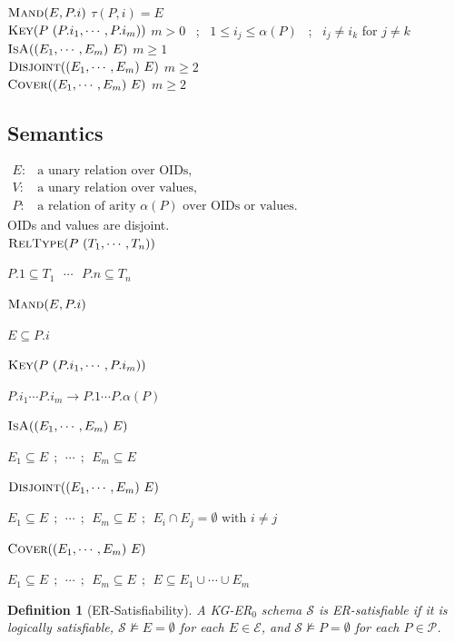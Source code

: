 \documentclass[10pt]{article}
\newtheorem*{definition}{Definition}
\begin{document}
$\textsc{Mand}(E, P.i)$
\hfill { $\tau(P,i)=E$}\\
%
$\textsc{Key}(P\ (P.i_1, \cdots , P.i_m))$ \hfill{ $m>0$ ~;~ \(1\leq i_j\leq\alpha(P)\) ~;~ \(i_j\neq i_k\) for $j\neq k$}\\
%
$\textsc{IsA}((E_1,\cdots,E_m)\ E)$ \hfill{ $m\geq 1$}\\
$\textsc{Disjoint}((E_1,\cdots,E_m)\ E)$ \hfill{ $m\geq 2$}\\
$\textsc{Cover}((E_1,\cdots,E_m)\ E)$ \hfill{ $m\geq 2$}


\subsection*{Semantics}

\noindent$
\begin{array}{ll}
E: & \text{a unary relation over OIDs,}\\
V: & \text{a unary relation over values,}\\
P: & \text{a relation of arity \(\alpha(P)\) over OIDs or values.}
\end{array}
$\\
OIDs and values are disjoint.
\\

\noindent
$\textsc{RelType}(P\ (T_1, \cdots , T_n))$

$P.1\subseteq T_1 ~~~\cdots~~~ P.n\subseteq T_n$

\noindent
$\textsc{Mand}(E, P.i)$

$E\subseteq P.i$

\noindent
$\textsc{Key}(P\ (P.i_1, \cdots , P.i_m))$

$P.i_1 \cdots P.i_m\rightarrow P.1\cdots P.{\alpha(P)}$

\noindent
$\textsc{IsA}((E_1,\cdots,E_m)\ E)$

$E_1\subseteq E ~~;~~\cdots ~~;~~E_m\subseteq E$

\noindent
$\textsc{Disjoint}((E_1,\cdots,E_m)\ E)$ 
 
$E_1\subseteq E ~~;~~\cdots ~~;~~E_m\subseteq E ~~;~~
E_i\cap E_j=\emptyset \text{ with } i\neq j$

\noindent
$\textsc{Cover}((E_1,\cdots,E_m)\ E)$

$E_1\subseteq E ~~;~~\cdots ~~;~~E_m\subseteq E ~~;~~
E\subseteq E_1 \cup\cdots\cup E_m$

\begin{definition}[ER-Satisfiability]
A KG-ER$_0$ schema \(\mathcal S\) is \emph{ER-satisfiable} if it is
logically satisfiable, \(\mathcal S\not\models E=\emptyset\) for each
\(E\in\mathcal E\), and \(\mathcal S\not\models P=\emptyset\) for each
\(P\in\mathcal P\).
\end{definition}
\end{document}
